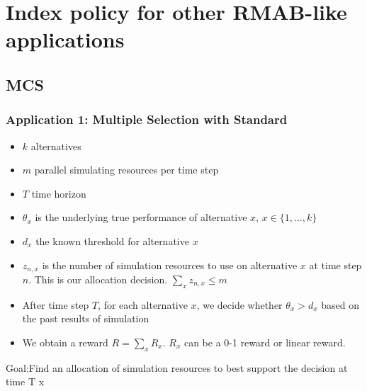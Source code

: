 \documentclass{beamer}
\begin{document}
\section{Index policy for other RMAB-like applications}
\subsection{MCS}
\begin{frame}[plain]
\frametitle{Application 1: Multiple Selection with Standard}
\begin{itemize}
\item $k$ alternatives
\item $m$ parallel simulating resources per time step
\item $T$ time horizon
\item $\theta_x$ is the underlying true performance of alternative $x$, $x\in\{1,...,k\}$
\item $d_x$ the known threshold for alternative $x$
\item $z_{n,x}$ is the number of simulation resources to use on alternative $x$ at time step $n$. This is our allocation decision. $\sum_x z_{n,x}\leq m$
\item After time step $T$, for each alternative $x$, we decide whether $\theta_x>d_x$ based on the past results of simulation
\item We obtain a reward $R = \sum_x R_x$. $R_x$ can be a 0-1 reward or linear reward.
\end{itemize}
{\Large \color{red} Goal:Find an allocation of simulation resources to best support the decision at time T}
x\end{frame}
\end{document}
